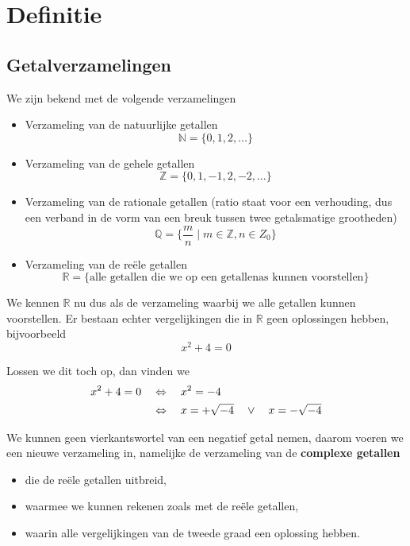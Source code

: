 \documentclass[12pt,twoside,a4paper]{article}
\begin{document}
\begin{singlespacing}
  \begin{small}
    \tableofcontents
  \end{small}
\end{singlespacing}
\thispagestyle{empty}
\pagebreak


\pagestyle{fancy}
\fancyhead[RE,LO]{}

\section{Definitie}

\subsection{Getalverzamelingen}

We zijn bekend met de volgende verzamelingen
\begin{itemize}
  \item Verzameling van de natuurlijke getallen
  $$\mathbb{N}=\{0, 1, 2, \ldots\}$$
  \item Verzameling van de gehele getallen
  $$\mathbb{Z}=\{0, 1, -1, 2, -2, \ldots\}$$
  \item Verzameling van de rationale getallen (ratio staat voor een verhouding, dus een verband in de vorm van een breuk tussen twee getalsmatige grootheden)
  $$\mathbb{Q}=\{\frac{m}{n}\;|\;m\in\mathbb{Z}, n\in{Z}_0\}$$
  \item Verzameling van de reële getallen
  $$\mathbb{R}=\{\mbox{alle getallen die we op een getallenas kunnen voorstellen}\}$$
\end{itemize}

We kennen $\mathbb{R}$ nu dus als de verzameling waarbij we alle getallen kunnen voorstellen. Er bestaan echter vergelijkingen die in $\mathbb{R}$ geen oplossingen hebben, bijvoorbeeld
$$x^2+4=0$$

Lossen we dit toch op, dan vinden we
\begin{align*}
  x^2+4=0 \quad & \Leftrightarrow\quad x^2 = -4\\
             & \Leftrightarrow\quad x = +\sqrt{-4} \quad\vee\quad x = -\sqrt{-4}
\end{align*}

We kunnen geen vierkantswortel van een negatief getal nemen, daarom voeren we een nieuwe verzameling in, namelijke de verzameling van de {\bf complexe getallen}
\begin{itemize}
  \item die de reële getallen uitbreid,
  \item waarmee we kunnen rekenen zoals met de reële getallen,
  \item waarin alle vergelijkingen van de tweede graad een oplossing hebben.
\end{itemize}
\end{document}
